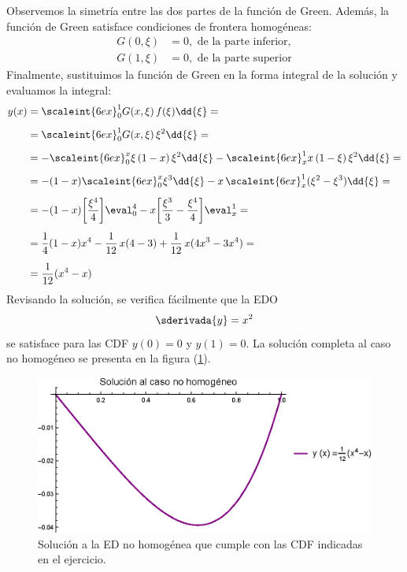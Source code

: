 Observemos la simetría entre las dos partes de la función de Green. \break \hfill Además, la función de Green satisface condiciones de frontera homogéneas: 
\begin{align*}
G (0, \xi) &= 0, \mbox{ de la parte inferior}, \\[0.5em]
G (1, \xi) &= 0, \mbox{ de la parte superior}
\end{align*}
Finalmente, sustituimos la función de Green en la forma integral de la solución y evaluamos la integral:
\begin{align}
\begin{aligned}[b]
y (x) &= \scaleint{6ex}_{0}^{1} G (x, \xi) \, f (\xi) \dd{\xi} = \\[0.5em]
&= \scaleint{6ex}_{0}^{1} G (x, \xi) \, \xi^{2} \dd{\xi} = \\[0.5em]
&= - \scaleint{6ex}_{0}^{x} \xi \, (1 - x) \, \xi^{2} \dd{\xi} - \scaleint{6ex}_{x}^{1} x \, (1 - \xi) \, \xi^{2} \dd{\xi} = \\[0.5em]
&= - (1 - x) \scaleint{6ex}_{0}^{x} \xi^{3} \dd{\xi} - x \, \scaleint{6ex}_{x}^{1} (\xi^{2} - \xi^{3}) \dd{\xi} = \\[0.5em]
&= - (1 - x) \bigg[ \dfrac{\xi^{4}}{4} \bigg] \eval_{0}^{4} - x \bigg[ \dfrac{\xi^{3}}{3} - \dfrac{\xi^{4}}{4} \bigg] \eval_{x}^{1} = \\[0.5em]
&= \dfrac{1}{4} (1 - x) x^{4} - \dfrac{1}{12} \, x (4 - 3) + \dfrac{1}{12} \, x (4 x^{3} - 3 x^{4}) = \\[0.5em]
&= \dfrac{1}{12} (x^{4} - x)
\end{aligned}
\label{eq:ecuacion_07_36}
\end{align}
Revisando la solución, se verifica fácilmente que la EDO
\begin{align*}
\sderivada{y} = x^{2}
\end{align*}
se satisface para las CDF $y (0) = 0$ y $y (1) = 0$. La solución completa al caso no homogéneo se presenta en la figura (\ref{fig:figura_04}).
\begin{figure}[H]
    \centering
    \includegraphics[scale=1]{Imagenes/Plot_EDONH_Green_02.eps}
    \caption{Solución a la ED no homogénea que cumple con las CDF indicadas en el ejercicio.}
    \label{fig:figura_04}
\end{figure}

